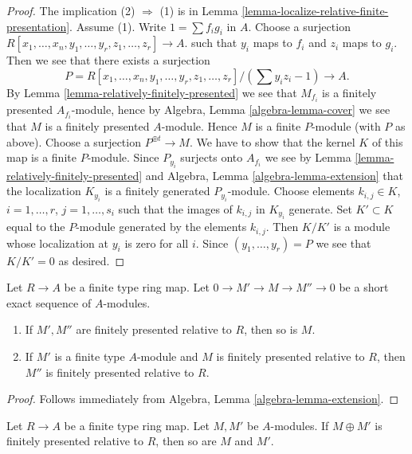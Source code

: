 \begin{proof}
The implication (2) $\Rightarrow$ (1) is in
Lemma \ref{lemma-localize-relative-finite-presentation}.
Assume (1). Write $1 = \sum f_ig_i$ in $A$.
Choose a surjection
$R[x_1, \ldots, x_n, y_1, \ldots, y_r, z_1, \ldots, z_r] \to A$.
such that $y_i$ maps to $f_i$ and $z_i$ maps to $g_i$. Then we
see that there exists a surjection
$$
P = R[x_1, \ldots, x_n, y_1, \ldots, y_r, z_1, \ldots, z_r]/(\sum y_iz_i - 1)
\longrightarrow
A.
$$
By
Lemma \ref{lemma-relatively-finitely-presented}
we see that $M_{f_i}$ is a finitely presented $A_{f_i}$-module, hence by
Algebra, Lemma \ref{algebra-lemma-cover}
we see that $M$ is a finitely presented $A$-module.
Hence $M$ is a finite $P$-module (with $P$ as above).
Choose a surjection $P^{\oplus t} \to M$.
We have to show that the kernel $K$ of this map is a finite
$P$-module. Since $P_{y_i}$ surjects onto
$A_{f_i}$ we see by
Lemma \ref{lemma-relatively-finitely-presented}
and
Algebra, Lemma \ref{algebra-lemma-extension}
that the localization $K_{y_i}$ is a finitely generated
$P_{y_i}$-module. Choose elements
$k_{i, j} \in K$, $i = 1, \ldots, r$, $j = 1, \ldots, s_i$ such
that the images of $k_{i, j}$ in $K_{y_i}$ generate.
Set $K' \subset K$ equal to the $P$-module
generated by the elements $k_{i, j}$. Then $K/K'$ is a module
whose localization at $y_i$ is zero for all $i$. Since $(y_1, \ldots, y_r) = P$
we see that $K/K' = 0$ as desired.
\end{proof}

\begin{lemma}
\label{lemma-ses-relatively-finite-presentation}
Let $R \to A$ be a finite type ring map. Let $0 \to M' \to M \to M'' \to 0$
be a short exact sequence of $A$-modules.
\begin{enumerate}
\item If $M', M''$ are finitely presented relative to $R$, then so is $M$.
\item If $M'$ is a finite type $A$-module and $M$ is finitely presented
relative to $R$, then $M''$ is finitely presented relative to $R$.
\end{enumerate}
\end{lemma}

\begin{proof}
Follows immediately from
Algebra, Lemma \ref{algebra-lemma-extension}.
\end{proof}

\begin{lemma}
\label{lemma-sum-relatively-finite-presentation}
Let $R \to A$ be a finite type ring map.
Let $M, M'$ be $A$-modules. If $M \oplus M'$ is
finitely presented relative to $R$, then so are $M$ and $M'$.
\end{lemma}

